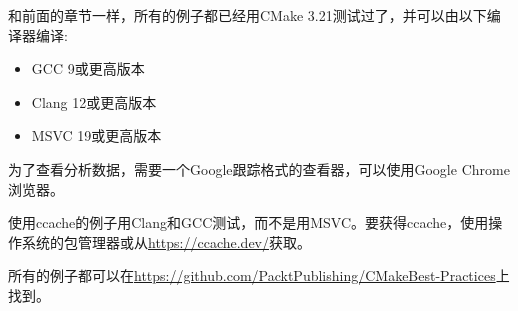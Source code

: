 和前面的章节一样，所有的例子都已经用CMake 3.21测试过了，并可以由以下编译器编译:

\begin{itemize}
\item 
GCC 9或更高版本

\item 
Clang 12或更高版本

\item 
MSVC 19或更高版本
\end{itemize}

为了查看分析数据，需要一个Google跟踪格式的查看器，可以使用Google Chrome浏览器。

使用ccache的例子用Clang和GCC测试，而不是用MSVC。要获得ccache，使用操作系统的包管理器或从\url{https://ccache.dev/}获取。

所有的例子都可以在\url{https://github.com/PacktPublishing/CMakeBest-Practices}上找到。










